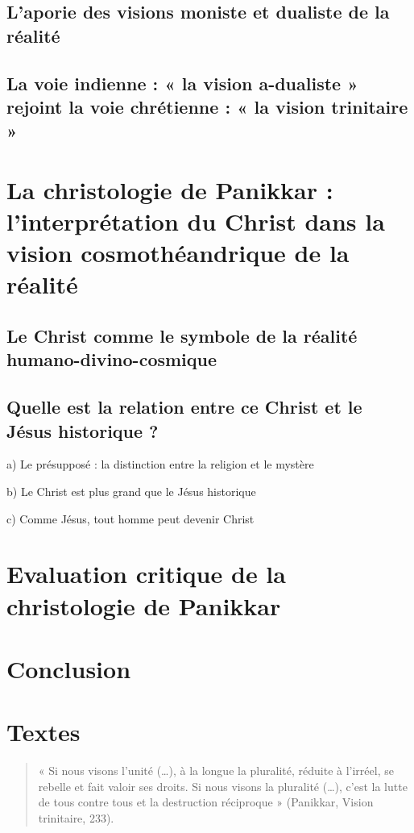 \subsection{L’aporie des visions moniste et dualiste de la réalité}
 
\subsection{La voie indienne : « la vision a-dualiste » rejoint la voie chrétienne : « la vision
trinitaire »}
 
\section{La christologie de Panikkar : l’interprétation du Christ dans la vision
cosmothéandrique de la réalité} 

\subsection{Le Christ comme le symbole de la réalité humano-divino-cosmique}
  
\subsection{Quelle est la relation entre ce Christ et le Jésus historique ?}
 


a) Le présupposé : la distinction entre la religion et le mystère


b) Le Christ est plus grand que le Jésus historique


c) Comme Jésus, tout homme peut devenir Christ

\section{Evaluation critique de la christologie de Panikkar}

\section{Conclusion}


\section{Textes}

\begin{quote}
    « Si nous visons l’unité (…), à la longue la pluralité, réduite à l’irréel, se rebelle et fait valoir
ses droits. Si nous visons la pluralité (…), c’est la lutte de tous contre tous et la destruction
réciproque » (Panikkar, Vision trinitaire, 233).
\end{quote}

